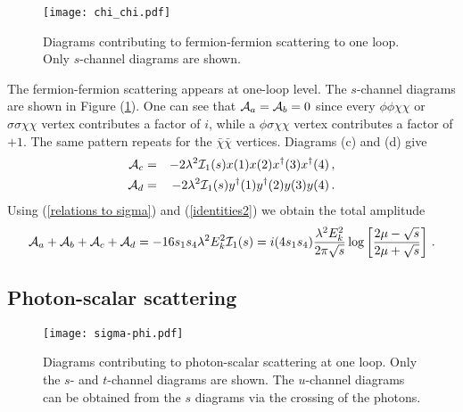 \documentclass[11pt]{article}
\begin{document}
\begin{figure}[t] %
   \centering
   \texttt{[image: chi\_chi.pdf]} 
   \caption{Diagrams contributing to fermion-fermion scattering to one loop. Only $s$-channel diagrams are shown.}
	\label{fermion fermion one loop}
\end{figure}


The fermion-fermion scattering appears at one-loop level. The  $s$-channel diagrams are shown in Figure (\ref{fermion fermion one loop}). One can see that ${\cal A}_a = {\cal A}_b=0$ since every $\phi\phi\chi\chi$ or $\sigma\sigma \chi\chi$ vertex contributes a factor of  $i$, while a $\phi\sigma\chi\chi$ vertex contributes a factor of $+1$. The same pattern repeats for the $\bar\chi\bar \chi$ vertices. Diagrams (c) and (d) give 
%
\begin{eqnarray}
\nonumber
{\cal A}_c&=&-2\lambda^2 {\cal I}_1(s) x(1)x(2)x^\dagger(3)x^\dagger(4)\,,\\
{\cal A}_d&=& -2\lambda^2 {\cal I}_1(s) y^\dagger(1)y^\dagger(2)y(3)y(4)\,.
\end{eqnarray}
%
Using (\ref{relations to sigma}) and (\ref{identities2}) we obtain the total amplitude
%
\begin{eqnarray}
{\cal A}_a+{\cal A}_b+{\cal A}_c+{\cal A}_d=-16s_1s_4\lambda^2 E_k^2{\cal I}_1(s)=i(4s_1s_4)\frac{\lambda^2 E_k^2}{2\pi \sqrt s}\log \left[\frac{2\mu-\sqrt s}{2\mu +\sqrt s}\right]\,.
\label{fermion fermion amplitude}
\end{eqnarray}
% 



\subsection*{Photon-scalar scattering}

\begin{figure}[t] %
   \centering
   \texttt{[image: sigma-phi.pdf]} 
   \caption{Diagrams contributing to photon-scalar scattering at one loop. Only the $s$- and $t$-channel diagrams are shown. The $u$-channel diagrams can be obtained from the $s$ diagrams via the crossing of the photons.}
	\label{photon scalar one loop}
\end{figure}
\end{document}
